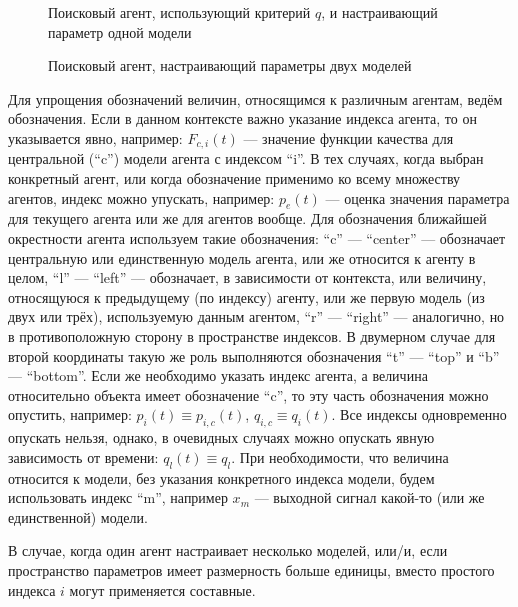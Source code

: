 \begin{figure}[htb!]
\begin{center}

\end{center}
\caption{Поисковый агент, использующий критерий $q$, и настраивающий параметр одной модели}
\label{atu:f:agent1q}
\end{figure}


\begin{figure}[htb!]
\begin{center}

\end{center}
\caption{Поисковый агент, настраивающий параметры двух моделей}
\label{atu:f:agent2}
\end{figure}


Для упрощения обозначений величин, относящимся к различным агентам,
ведём обозначения. Если в данном контексте важно указание
индекса агента, то он указывается явно, например:
$F_{c,i}(t)$ --- значение функции качества для центральной (``c'') модели
агента с индексом ``i''. В тех случаях, когда
выбран конкретный агент, или когда обозначение применимо
ко всему множеству агентов, индекс можно упускать, например:
$p_e(t)$\label{atu:d:p_e} --- оценка значения параметра для текущего агента
или же для агентов вообще. Для обозначения ближайшей окрестности
агента используем такие обозначения:
``c'' --- ``center'' --- обозначает центральную или единственную
модель агента, или же относится к агенту в целом,
``l'' --- ``left'' --- обозначает, в зависимости от контекста,
или величину, относящуюся к предыдущему (по индексу) агенту,
или же первую модель (из двух или трёх), используемую
данным агентом,
``r'' --- ``right'' --- аналогично,
но в противоположную сторону в пространстве индексов.
В двумерном случае для второй координаты такую же роль
выполняются обозначения ``t'' --- ``top''
и ``b'' --- ``bottom''.
Если же необходимо указать индекс агента,
а величина относительно объекта
имеет обозначение ``c'', то эту часть обозначения
можно опустить, например:
$ p_i(t) \equiv p_{i,c}(t)$, $q_{i,c} \equiv q_{i}(t)$.
Все индексы одновременно опускать нельзя,
однако, в очевидных случаях можно опускать явную
зависимость от времени:
$ q_l(t) \equiv q_l$.
При необходимости, что величина относится к модели,
без указания конкретного индекса модели,
будем использовать индекс ``m'',
например $x_m$ --- выходной сигнал какой-то
(или же единственной) модели.

В случае, когда один агент настраивает несколько моделей,
или/и, если пространство параметров имеет размерность больше единицы,
вместо простого индекса $i$ могут применяется составные.

